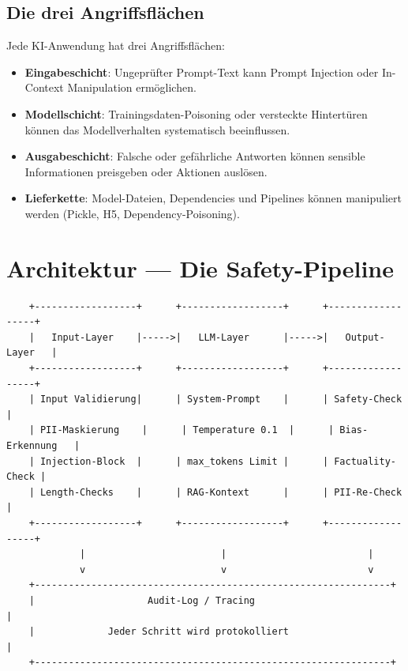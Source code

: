\subsection{Die drei Angriffsflächen}

Jede KI-Anwendung hat drei Angriffsflächen:

\begin{itemize}[leftmargin=*]
     \item \textbf{Eingabeschicht}: Ungeprüfter Prompt-Text kann Prompt Injection oder In-Context Manipulation ermöglichen.
     \item \textbf{Modellschicht}: Trainingsdaten-Poisoning oder versteckte Hintertüren können das Modellverhalten systematisch beeinflussen.
     \item \textbf{Ausgabeschicht}: Falsche oder gefährliche Antworten können sensible Informationen preisgeben oder Aktionen auslösen.
     \item \textbf{Lieferkette}: Model-Dateien, Dependencies und Pipelines können manipuliert werden (Pickle, H5, Dependency-Poisoning).
\end{itemize}


\section{Architektur --- Die Safety-Pipeline}

\begin{verbatim}
    +------------------+      +------------------+      +------------------+
    |   Input-Layer    |----->|   LLM-Layer      |----->|   Output-Layer   |
    +------------------+      +------------------+      +------------------+
    | Input Validierung|      | System-Prompt    |      | Safety-Check     |
    | PII-Maskierung    |      | Temperature 0.1  |      | Bias-Erkennung   |
    | Injection-Block  |      | max_tokens Limit |      | Factuality-Check |
    | Length-Checks    |      | RAG-Kontext      |      | PII-Re-Check     |
    +------------------+      +------------------+      +------------------+
             |                        |                         |
             v                        v                         v
    +---------------------------------------------------------------+
    |                    Audit-Log / Tracing                          |
    |             Jeder Schritt wird protokolliert                     |
    +---------------------------------------------------------------+
\end{verbatim}

